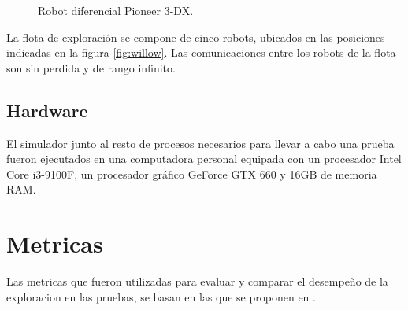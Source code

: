 \begin{figure}[H]
  \centerfloat


  \qquad

  \caption[Robot diferencial Pioneer 3-DX.]{Robot diferencial Pioneer 3-DX.}\label{fig:p3dx}

\end{figure}

La flota de exploración se compone de cinco robots, ubicados en las posiciones
indicadas en la figura \ref{fig:willow}. Las comunicaciones entre los robots de
la flota son sin perdida y de rango infinito.

\subsection{Hardware}
El simulador junto al resto de procesos necesarios para llevar a cabo una
prueba fueron ejecutados en una computadora personal equipada con un procesador
Intel Core i3-9100F, un procesador gráfico GeForce GTX 660 y 16GB de memoria
RAM.

\section{Metricas}
Las metricas que fueron utilizadas para evaluar y comparar el desempeño de la
exploracion en las pruebas, se basan en las que se proponen en
\cite{yan2015metrics}.



